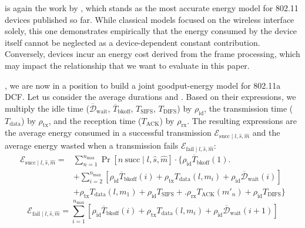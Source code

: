 \documentclass[twoside,nohyper]{tufte-book}
\makeatletter
\let\orig@maketag@@@\maketag@@@
\renewcommand{\eqref}[1]{\textup{\let\maketag@@@\orig@maketag@@@\tagform@{\ref{#1}}}}
\def\maketag@@@#1{\hbox{\rlap{\kern\marginparsep\m@th\normalfont#1}\kern1sp}}
\theoremstyle{definition}
\theoremstyle{definition}
\theoremstyle{definition}
\theoremstyle{remark}
\makeatother
\begin{document}
 is again the work by
\citet{Serrano2014}\cite{Serrano2014}, which stands as the most accurate
energy model for 802.11 devices published so far. While classical models
focused on the wireless interface solely, this one demonstrates
empirically that the energy consumed by the device itself cannot be
neglected as a device-dependent constant contribution. Conversely,
devices incur an energy cost derived from the frame processing, which
may impact the relationship that we want to evaluate in this paper.

, we are now in a position to
build a joint goodput-energy model for 802.11a DCF. Let us consider the
average durations \eqref{eq:Dsucc} and \eqref{eq:Dfail}. Based on their
expressions, we multiply the idle time
(\(\overline{\mathcal{D}}_\mathrm{wait}\),
\(\overline{T}_\mathrm{bkoff}\), \(T_\mathrm{SIFS}\),
\(T_\mathrm{DIFS}\)) by \(\rho_\mathrm{id}\), the transmission time
(\(T_\mathrm{data}\)) by \(\rho_\mathrm{tx}\), and the reception time
(\(T_\mathrm{ACK}\)) by \(\rho_\mathrm{rx}\). The resulting expressions
are the average energy consumed in a successful transmission
\(\mathcal{E}_{\mathrm{succ} \mid l, \hat{s}, \hat{m}}\) and the average
energy wasted when a transmission fails
\(\mathcal{E}_{\mathrm{fail} \mid l, \hat{s}, \hat{m}}\):
%
\begin{equation}
\begin{split}
 \mathcal{E}_{\mathrm{succ} \mid l, \hat{s}, \hat{m}} = &\sum_{n=1}^{n_\mathrm{max}} \Pr[n \mathrm{~succ} \mid l, \hat{s}, \hat{m}] \cdot \biggl\lbrace \rho_\mathrm{id}\overline{T}_\mathrm{bkoff}(1) \biggr. \\
 &+ \sum_{i=2}^{n_\mathrm{max}} \left[\rho_\mathrm{id}\overline{T}_\mathrm{bkoff}(i)\right.+ \left.\rho_\mathrm{tx}T_\mathrm{data}(l, m_i) + \rho_\mathrm{id}\overline{\mathcal{D}}_\mathrm{wait}(i)\right] \\
 &+ \rho_\mathrm{tx}T_\mathrm{data}(l, m_1) + \rho_\mathrm{id}T_\mathrm{SIFS} + \biggl.\rho_\mathrm{rx}T_\mathrm{ACK}(m'_n) + \rho_\mathrm{id}T_\mathrm{DIFS} \biggr\rbrace
\end{split}
\label{eq:Esucc}
\end{equation}
%
\begin{equation}
 \mathcal{E}_{\mathrm{fail} \mid l, \hat{s}, \hat{m}} = \sum_{i=1}^{n_\mathrm{max}} \left[\rho_\mathrm{id}\overline{T}_\mathrm{bkoff}(i) + \rho_\mathrm{tx}T_\mathrm{data}(l, m_i) + \rho_\mathrm{id}\overline{\mathcal{D}}_\mathrm{wait}(i+1)\right]
\label{eq:Efail}
\end{equation}
%
\end{document}
